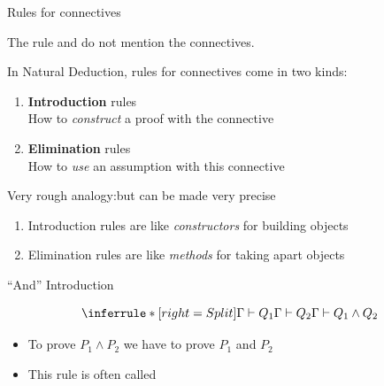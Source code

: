 \documentclass[xetex,aspectratio=169,14pt,hyperref={pdfpagelabels=true,pdflang={en-GB}}]{beamer}
\begin{document}
\begin{frame}
  {Rules for connectives}

  \bigskip

  The rule  and  do not mention the connectives.

  \bigskip

  In Natural Deduction, rules for connectives come in two kinds:

  \bigskip

  \begin{enumerate}
  \item {\bf Introduction} rules\\
    \textcolor{black!60}{How to \emph{construct} a proof with the connective}
  \item {\bf Elimination} rules \\
    \textcolor{black!60}{How to \emph{use} an assumption with this connective}
  \end{enumerate}

  \bigskip
  \pause

  Very rough analogy:\quad \textcolor{black!60}{but can be made very precise}
  \begin{enumerate}
  \item Introduction rules are like \emph{constructors} for building objects
  \item Elimination rules are like \emph{methods} for taking apart objects
  \end{enumerate}
\end{frame}


\begin{frame}
  {``And'' Introduction}


  \begin{displaymath}
    \inferrule* [right=Split]
    {\Gamma \vdash Q_1 \\ \Gamma \vdash Q_2}
    {\Gamma \vdash Q_1 \land Q_2}
  \end{displaymath}

  \bigskip
  \pause

  \begin{itemize}
  \item To prove $P_1 \land P_2$ we have to prove $P_1$ and $P_2$
  \item This rule is often called 
  \end{itemize}
\end{frame}
\end{document}
